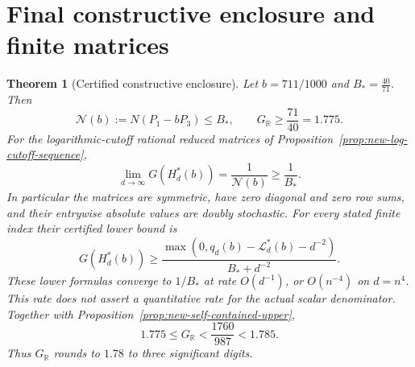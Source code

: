 \documentclass[11pt]{article}
\newtheorem{theorem}{Theorem}
\begin{document}
\section{Final constructive enclosure and finite matrices}\label{sec:new-final-goal}
\begin{theorem}[Certified constructive enclosure]
\label{thm:new-final-goal-global-norm}
Let $b=711/1000$ and $B_*=\frac{40}{71}$. Then
\[
 \mathcal N(b):=N(P_1-bP_3)\leq B_*,\qquad
 G_{\mathbb R}\geq \frac{71}{40}=1.775.
\]
For the logarithmic-cutoff rational reduced matrices of
Proposition~\ref{prop:new-log-cutoff-sequence},
\[
 \lim_{d\to\infty}G(H_d^*(b))=\frac1{\mathcal N(b)}\geq\frac1{B_*}.
\]
In particular the matrices are symmetric, have zero diagonal and zero row
sums, and their entrywise absolute values are doubly stochastic.
For every stated finite index their certified lower bound is
\[
 G(H_d^*(b))\geq
 \frac{\max(0,q_d(b)-\mathcal L_d^*(b)-d^{-2})}{B_*+d^{-2}}.
\]
These lower formulas converge to $1/B_*$ at rate $O(d^{-1})$, or
$O(n^{-4})$ on $d=n^4$. This rate does not assert a quantitative rate
for the actual scalar denominator.
Together with Proposition~\ref{prop:new-self-contained-upper},
\[
 1.775\leq G_{\mathbb R}<\frac{1760}{987}<1.785.
\]
Thus $G_{\mathbb R}$ rounds to $1.78$ to three significant digits.
\end{theorem}
\end{document}
